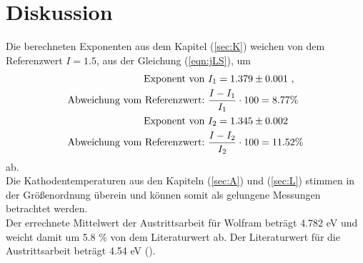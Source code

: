 \section{Diskussion}
\label{sec:Diskussion}

Die berechneten Exponenten aus dem Kapitel (\ref{sec:K}) weichen von dem Referenzwert $I = 1.5$, aus der Gleichung (\ref{eqn:jLS}), um
\begin{align*}
  \text{Exponent von}\ & I_1 = \num{1.379 +- 0.001} \ , \\
  \text{Abweichung vom Referenzwert:}\ & \frac{I - I_1}{I_1} \cdot 100 = 8.77\% \\
  \text{Exponent von}\ & I_2 = \num{1.345 +- 0.002} \\
  \text{Abweichung vom Referenzwert:}\ & \frac{I - I_2}{I_2} \cdot 100 = 11.52\%
\end{align*}
ab. \\
Die Kathodentemperaturen aus den Kapiteln (\ref{sec:A}) und (\ref{sec:L}) stimmen in der Größenordnung überein und können somit als gelungene Messungen betrachtet werden. \\
Der errechnete Mittelwert der Austrittsarbeit für Wolfram beträgt 4.782 eV und weicht damit um 5.8 \% von dem Literaturwert ab. Der Literaturwert für die Austrittsarbeit beträgt 4.54 eV (\cite{Wolfram}).
